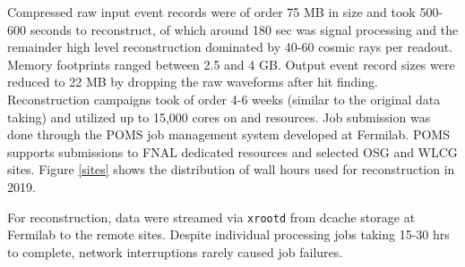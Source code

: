 Compressed raw input event records were of order 75 MB in size and took 500-600 seconds to reconstruct, of which around 180 sec was signal processing and the remainder high level reconstruction dominated by 40-60 cosmic rays per readout.  Memory footprints ranged between 2.5 and 4 GB.  Output event  record sizes were reduced to 22 MB by dropping the raw waveforms after hit finding.   Reconstruction campaigns took of order 4-6 weeks (similar to the original data taking) and utilized up to 15,000 cores on  and  resources.  Job submission was done through the POMS\cite{poms} job management system developed at Fermilab. POMS supports submissions to FNAL dedicated resources and selected OSG and WLCG sites.  Figure \ref{sites} shows the distribution of wall hours used for reconstruction in 2019. 

For reconstruction, data were streamed via {\tt xrootd}\cite{Behrmann:2011zz} from {dcache} storage at Fermilab to the remote sites. Despite individual processing jobs taking 15-30 hrs to complete, network interruptions rarely caused job failures. 


 

